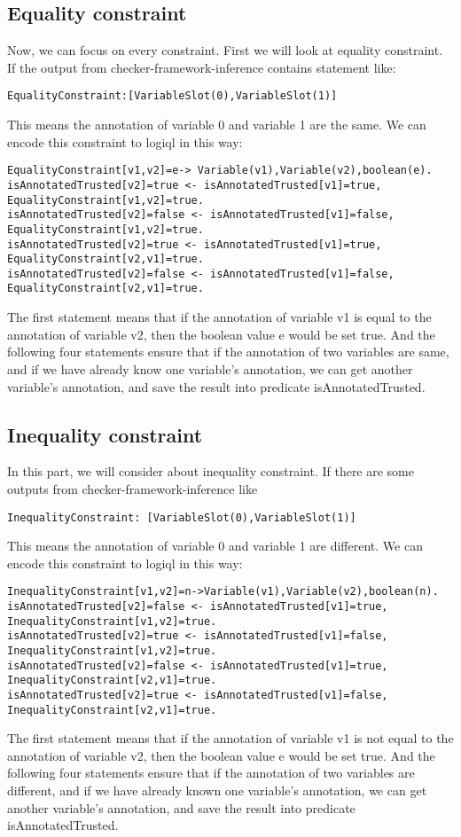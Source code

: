 \documentclass{article}
\begin{document}
\subsection{Equality constraint}
Now, we can focus on every constraint.  First we will look at equality constraint.
If the output from checker-framework-inference contains statement like:
\begin{lstlisting}
EqualityConstraint:[VariableSlot(0),VariableSlot(1)]
\end{lstlisting}
This means the annotation of variable 0 and variable 1 are the same.
We can encode this constraint to logiql in this way:
\begin{lstlisting}[breaklines=true]
EqualityConstraint[v1,v2]=e-> Variable(v1),Variable(v2),boolean(e).
isAnnotatedTrusted[v2]=true <- isAnnotatedTrusted[v1]=true, EqualityConstraint[v1,v2]=true.
isAnnotatedTrusted[v2]=false <- isAnnotatedTrusted[v1]=false, EqualityConstraint[v1,v2]=true.
isAnnotatedTrusted[v2]=true <- isAnnotatedTrusted[v1]=true, EqualityConstraint[v2,v1]=true.
isAnnotatedTrusted[v2]=false <- isAnnotatedTrusted[v1]=false, EqualityConstraint[v2,v1]=true.
\end{lstlisting}
The first statement means that if the annotation of variable v1 is equal to the annotation of variable v2, then the boolean value e would be set true. And the following four statements ensure that if the annotation of two variables are same, and if we have already know one variable's annotation, we can get another variable's annotation, and save the result into predicate isAnnotatedTrusted.

\subsection{Inequality constraint}
In this part, we will consider about inequality constraint.  If there are some outputs from checker-framework-inference like 
\begin{lstlisting}
InequalityConstraint: [VariableSlot(0),VariableSlot(1)] 
\end{lstlisting}
This means the annotation of variable 0 and variable 1 are different.
We can encode this constraint to logiql in this way:
\begin{lstlisting}[breaklines=true]
InequalityConstraint[v1,v2]=n->Variable(v1),Variable(v2),boolean(n).
isAnnotatedTrusted[v2]=false <- isAnnotatedTrusted[v1]=true, InequalityConstraint[v1,v2]=true.
isAnnotatedTrusted[v2]=true <- isAnnotatedTrusted[v1]=false, InequalityConstraint[v1,v2]=true.
isAnnotatedTrusted[v2]=false <- isAnnotatedTrusted[v1]=true, InequalityConstraint[v2,v1]=true.
isAnnotatedTrusted[v2]=true <- isAnnotatedTrusted[v1]=false, InequalityConstraint[v2,v1]=true.
\end{lstlisting}
The first statement means that if the annotation of variable v1 is not equal to the annotation of variable v2, then the boolean value e would be set true.  And the following four statements ensure that if the annotation of two variables are different, and if we have already known one variable's annotation, we can get another variable's annotation, and save the result into predicate isAnnotatedTrusted.
\end{document}
